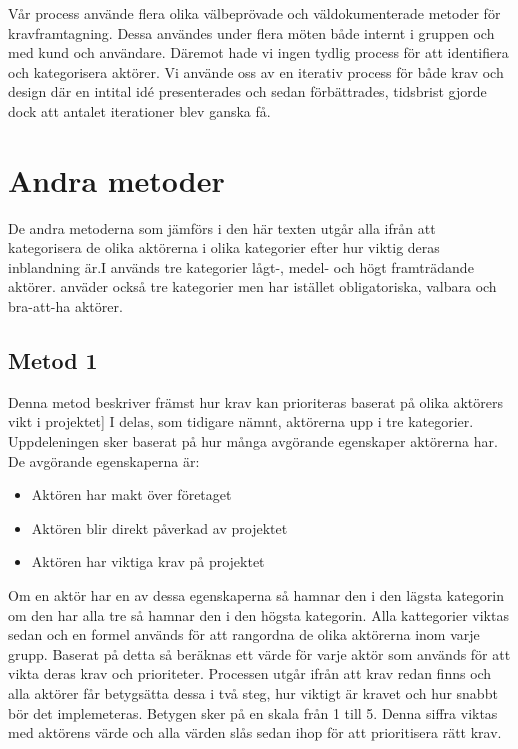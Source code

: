 Vår process använde flera olika välbeprövade och väldokumenterade metoder för kravframtagning. Dessa användes under flera möten både internt i gruppen och med kund och användare. Däremot hade vi ingen tydlig process för att identifiera och kategorisera aktörer. Vi använde oss av en iterativ process för både krav och design där en intital idé presenterades och sedan förbättrades, tidsbrist gjorde dock att antalet iterationer blev ganska få. 


\section{Andra metoder}
De andra metoderna som jämförs i den här texten utgår alla ifrån att kategorisera de olika aktörerna i olika kategorier efter hur viktig deras inblandning är.I \cite{cs_novel} används tre kategorier lågt-, medel- och högt framträdande aktörer. \cite{cs_sturctured} anväder också tre kategorier men har istället obligatoriska, valbara och bra-att-ha aktörer.

\subsection{Metod 1}
Denna metod beskriver främst hur krav kan prioriteras baserat på olika aktörers vikt i projektet]
I \cite{cs_novel} delas, som tidigare nämnt, aktörerna upp i tre kategorier. Uppdeleningen sker baserat på hur många avgörande egenskaper aktörerna har. De avgörande egenskaperna är:
\begin{itemize}
	\item Aktören har makt över företaget
	\item Aktören blir direkt påverkad av projektet
	\item Aktören har viktiga krav på projektet
\end{itemize}

Om en aktör har en av dessa egenskaperna så hamnar den i den lägsta kategorin om den har alla tre så hamnar den i den högsta kategorin. Alla kattegorier viktas sedan och en formel används för att rangordna de olika aktörerna inom varje grupp. Baserat på detta så beräknas ett värde för varje aktör som används för att vikta deras krav och prioriteter. Processen utgår ifrån att krav redan finns och alla aktörer får betygsätta dessa i två steg, hur viktigt är kravet och hur snabbt bör det implemeteras. Betygen sker på en skala från 1 till 5. Denna siffra viktas med aktörens värde och alla värden slås sedan ihop för att prioritisera rätt krav.

